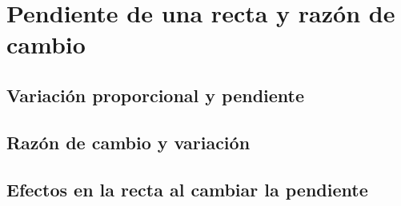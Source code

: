 \thispagestyle{plain}

\section{Pendiente de una recta y razón de cambio}

\subsection{Variación proporcional y pendiente}

\subsection{Razón de cambio y variación}

\subsection{Efectos en la recta al cambiar la pendiente}

\newpage
